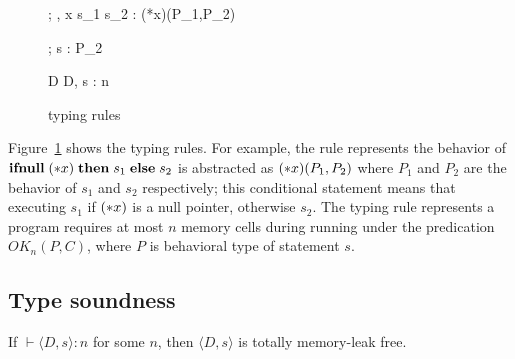 \begin{figure}
\begin{minipage}{\textwidth}
{\Theta ; \Gamma, x \vdash \IFNULL\Sirx \; \THEN s_{1}\; \ELSE s_{2} : (*x)(P_1,P_2)}


{\Theta ; \Gamma \vdash s : P_{2}}

        {\vdash D \COL \Theta}
{\vdash \langle D, s \rangle : n}

\end{minipage}
\caption{typing rules}
\label{fig:TypingRules}
\end{figure}

Figure~\ref{fig:TypingRules} shows the typing rules. For example, the
rule  represents the behavior of \(\mathbf{ifnull}\;(*x) \; \mathbf{then}\;
s_{1}\; \mathbf{else}\; s_{2}\) is abstracted as \((*x)(P_1, P_2)\) where
\(P_1\) and \(P_2\) are the behavior of \(s_1\) and \(s_2\)
respectively; this conditional statement means that executing \(s_1\)
if \((*x)\) is a null pointer, otherwise \(s_2\).  The typing rule
 represents a program requires at most \(n\) memory
cells during running under the predication \(OK_n(P, C)\), where \(P\)
is behavioral type of statement \(s\).


\subsection{Type soundness}
\begin{theorem}\label{thm1}
If $\vdash \langle D, s \rangle : n$ for some \(n\), then \(\langle D,
s \rangle\) is totally memory-leak free.
\end{theorem}

